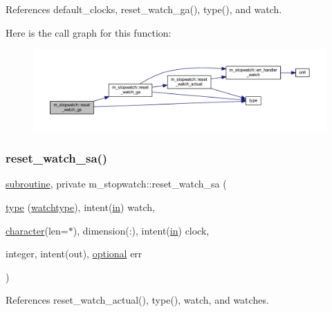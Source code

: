 References default\+\_\+clocks, reset\+\_\+watch\+\_\+ga(), type(), and watch.

Here is the call graph for this function\+:
\nopagebreak
\begin{figure}[H]
\begin{center}
\leavevmode
\includegraphics[width=350pt]{namespacem__stopwatch_a9044e009bd733b8a19724839001c496f_cgraph}
\end{center}
\end{figure}
\mbox{\label{namespacem__stopwatch_a845b765415e8f229b7f3251a96eaccc6}} 
\subsubsection{\texorpdfstring{reset\+\_\+watch\+\_\+sa()}{reset\_watch\_sa()}}
{\footnotesize\ttfamily \hyperlink{M__stopwatch_83_8txt_acfbcff50169d691ff02d4a123ed70482}{subroutine}, private m\+\_\+stopwatch\+::reset\+\_\+watch\+\_\+sa (\begin{DoxyParamCaption}\item[{\hyperlink{stop__watch_83_8txt_a70f0ead91c32e25323c03265aa302c1c}{type} (\hyperlink{structm__stopwatch_1_1watchtype}{watchtype}), intent(\hyperlink{M__journal_83_8txt_afce72651d1eed785a2132bee863b2f38}{in})}]{watch,  }\item[{\hyperlink{option__stopwatch_83_8txt_abd4b21fbbd175834027b5224bfe97e66}{character}(len=$\ast$), dimension(\+:), intent(\hyperlink{M__journal_83_8txt_afce72651d1eed785a2132bee863b2f38}{in})}]{clock,  }\item[{integer, intent(out), \hyperlink{option__stopwatch_83_8txt_aa4ece75e7acf58a4843f70fe18c3ade5}{optional}}]{err }\end{DoxyParamCaption})\hspace{0.3cm}{\ttfamily [private]}}



References reset\+\_\+watch\+\_\+actual(), type(), watch, and watches.

